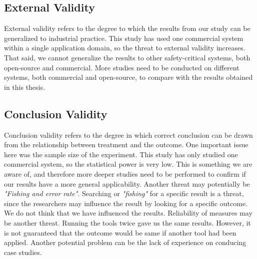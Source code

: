 
\subsection{External Validity}
\label{sub:external_validity}
External validity refers to the degree to which the results from our study can be generalized to industrial practice\cite{Wohlin:2000:ESE:330775}. This study has used one commercial system within a single application domain, so the threat to external validity increases. That said, we cannot generalize the results to other safety-critical systems, both open-source and commercial. More studies need to be conducted on different systems, both commercial and open-source, to compare with the results obtained in this thesis.


\subsection{Conclusion Validity} %
\label{sub:conclusion_validity}
Conclusion validity refers to the degree in which correct conclusion can be drawn from the relationship between treatment and the outcome\cite{Wohlin:2000:ESE:330775}. One important issue here was the sample size of the experiment. This study has only studied one commercial system, so the statistical power is very low. This is something we are aware of, and therefore more deeper studies need to be performed to confirm if our results have a more general applicability. Another threat may potentially be \textit{"Fishing and error rate"}. Searching or \textit{"fishing"} for a specific result is a threat\cite{Wohlin:2000:ESE:330775}, since the researchers may influence the result by looking for a specific outcome. We do not think that we have influenced the results. Reliability of measures may be another threat. Running the tools twice gave us the same results. However, it is not guaranteed that the outcome would be same if another tool had been applied. Another potential problem can be the lack of experience on conducing case studies.











